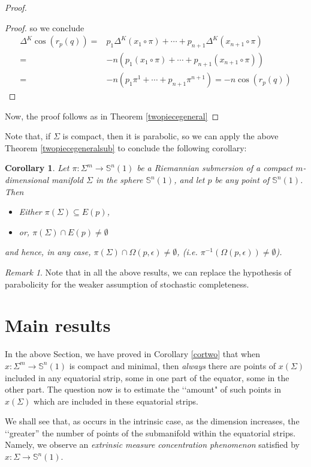 \documentclass{amsart}
\newtheorem{corollary}[theorem]{Corollary}
\theoremstyle{definition}
\theoremstyle{remark}
\newtheorem{remark}[theorem]{Remark}
\begin{document}
\begin{proof}
\begin{proof}
\noindent   so we conclude 
$$
\begin{aligned}
\Delta^K \cos(r_p(q))=&p_1\Delta^K(x_1\circ \pi)+\cdots+p_{n+1}\Delta^K(x_{n+1}\circ \pi)\\=&-n\left(p_1(x_1\circ \pi)+\cdots+p_{n+1}(x_{n+1}\circ\pi)\right)\\=&-n\left(p_1\pi^1+\cdots+p_{n+1}\pi^{n+1}\right)=-n\cos(r_p(q))
\end{aligned}
$$\end{proof}
 Now, the proof follows as in Theorem \ref{twopiecegeneral}
\end{proof}

Note that, if $\Sigma$ is compact, then it is parabolic, so we can apply  the above Theorem \ref{twopiecegeneralsub} to conclude the following corollary:
\begin{corollary}\label{cortwo2}
	Let  $\pi: \Sigma^m \to \mathbb{S}^n(1)$ be a Riemannian submersion of a compact  $m$-dimensional manifold $\Sigma$ in the sphere  $\mathbb{S}^n(1)$, and let $p$ be any point of $\mathbb{S}^n(1)$.  Then
    \begin{itemize}
        \item Either $\pi(\Sigma)\subseteq E(p)$, 
        \item or, $\pi(\Sigma)\cap E(p)\neq \emptyset$
            \end{itemize}
            and  hence, in any case,  $\pi(\Sigma) \cap \Omega(p,\epsilon) \neq \emptyset$, (i.e. $\pi^{-1}(\Omega(p,\epsilon))\neq \emptyset$).
\end{corollary}
\begin{remark}
Note that in all the above results, we can replace the hypothesis of parabolicity for the weaker assumption of stochastic completeness.
\end{remark}


\section{Main results}

In the above Section, we have proved in Corollary \ref{cortwo} that when $x: \Sigma^m \to \mathbb{S}^n(1)$ is  compact and minimal, then \emph{always} there are points of $x(\Sigma)$ included in any equatorial strip, some in one part of the equator, some in the other part. The question now is to estimate the \lq\lq amount" of such points in $x(\Sigma)$ which are included in these equatorial strips. 

We shall see that, as occurs in the intrinsic case, as the dimension increases, the \lq\lq greater'' the number of points of the submanifold within the equatorial strips. Namely, we observe an \emph{ extrinsic measure concentration phenomenon} satisfied by $x: \Sigma\to \mathbb{S}^n(1)$.
\end{document}

